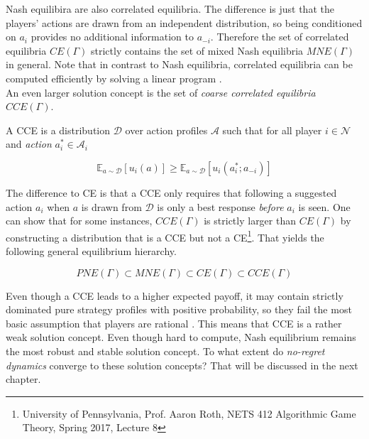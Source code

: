 Nash equilibira are also correlated equilibria. The difference is just that the players' actions are drawn from an independent distribution, so being conditioned on $a_i$ provides no additional information to $a_{-i}$. Therefore the set of correlated equilibria $CE(\Gamma)$ strictly contains the set of mixed Nash equilibria $MNE(\Gamma)$ in general. Note that in contrast to Nash equilibria, correlated equilibria can be computed efficiently by solving a linear program \cite{HDRmertikopoulos}. \\

An even larger solution concept is the set of \textit{coarse correlated equilibria} $CCE(\Gamma)$. 

\begin{definition}
    A CCE is a distribution $\mathcal{D}$ over action profiles $\mathcal{A}$ such that for all player $i \in \mathcal{N}$ and \textit{action} $a_{i}^{*} \in \mathcal{A}_i$

    \[\mathbb{E}_{a \sim \mathcal{D}}[u_i(a)] \ge \mathbb{E}_{a \sim \mathcal{D}}[u_i(a_{i}^{*};a_{-i})]\]
\end{definition}

The difference to CE is that a CCE only requires that following a suggested action $a_i$ when $a$ is drawn from $\mathcal{D}$ is only a best response \textit{before} $a_i$ is seen. One can show that for some instances, $CCE(\Gamma)$ is strictly larger than $CE(\Gamma)$ by constructing a distribution that is a CCE but not a CE\footnote{University of Pennsylvania, Prof. Aaron Roth, NETS 412 Algorithmic Game Theory, Spring 2017, Lecture 8}. That yields the following general equilibrium hierarchy.

\begin{equation*}
    PNE(\Gamma) \subset MNE(\Gamma) \subset CE(\Gamma) \subset CCE(\Gamma)
\end{equation*}

Even though a CCE leads to a higher expected payoff, it may contain strictly dominated pure strategy profiles with positive probability, so they fail the most basic assumption that players are rational \cite{viossat}. This means that CCE is a rather weak solution concept. Even though hard to compute, Nash equilibrium remains the most robust and stable solution concept. To what extent do \textit{no-regret dynamics} converge to these solution concepts? That will be discussed in the next chapter.


